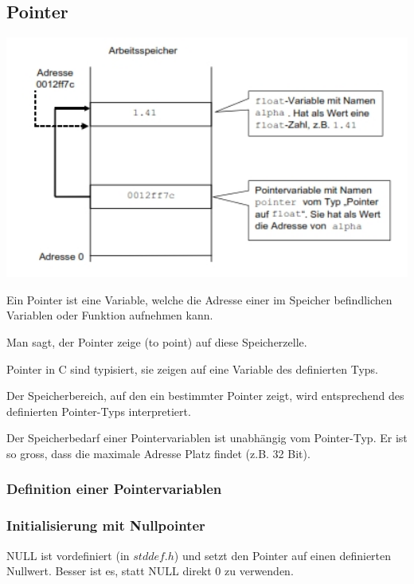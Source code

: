 	\begin{minipage}[t]{10.5 cm}
		\subsection{Pointer }
			\includegraphics[width=1\textwidth]{pics/pointer.jpg}
				
			\begin{compactitem}
				\item Ein Pointer ist eine Variable, welche die Adresse einer im Speicher befindlichen Variablen oder Funktion aufnehmen kann.
				\item Man sagt, der Pointer zeige (to point) auf diese Speicherzelle.
				\item Pointer in C sind typisiert, sie zeigen auf eine Variable des definierten Typs.
				\item Der Speicherbereich, auf den ein bestimmter Pointer zeigt, wird entsprechend des definierten Pointer-Typs interpretiert.
				\item Der Speicherbedarf einer Pointervariablen ist unabhängig vom Pointer-Typ. Er ist so gross, dass die maximale Adresse Platz findet (z.B. 32 Bit).
			\end{compactitem}
	\end{minipage}	

	\begin{minipage}[t]{10 cm}
		\subsubsection{Definition einer Pointervariablen }		
			\vspace*{-0.3cm}
	\end{minipage}
	\hspace*{0.5cm}
	\begin{minipage}[t]{8.5 cm}
		\subsubsection{Initialisierung mit Nullpointer }
			NULL ist vordefiniert (in $stddef.h$) und setzt den Pointer auf einen definierten Nullwert. Besser ist es, statt NULL direkt 0 zu verwenden.
			\vspace*{-0.2cm}
	\end{minipage}		
			
